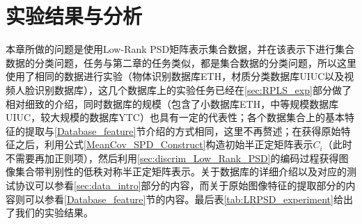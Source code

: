 \section{实验结果与分析}
本章所做的问题是使用Low-Rank PSD矩阵表示集合数据，并在该表示下进行集合数据的分类问题，任务与第二章的任务类似，都是集合数据的分类问题，所以这里使用了相同的数据进行实验（物体识别数据库ETH\cite{Database_ETH80}，材质分类数据库UIUC\cite{Database_UIUC}以及视频人脸识别数据库\cite{Database_YTC}），这几个数据库上的实验任务已经在\ref{sec:RPLS_exp}部分做了相对细致的介绍，同时数据库的规模（包含了小数据库ETH，中等规模数据库UIUC，较大规模的数据库YTC）也具有一定的代表性；各个数据集合上的基本特征的提取与\ref{Database_feature}节介绍的方式相同，这里不再赘述；在获得原始特征之后，利用公式\ref{MeanCov_SPD_Construct}构造初始半正定矩阵表示$C_{i}$（此时不需要再加正则项），然后利用\ref{sec:discrim_Low_Rank_PSD}的编码过程获得图像集合带判别性的低秩对称半正定矩阵表示。关于数据库的详细介绍以及对应的测试协议可以参看\ref{sec:data_intro}部分的内容，而关于原始图像特征的提取部分的内容则可以参看\ref{Database_feature}节的内容。最后表\ref{tab:LRPSD_experiment}给出了我们的实验结果。

